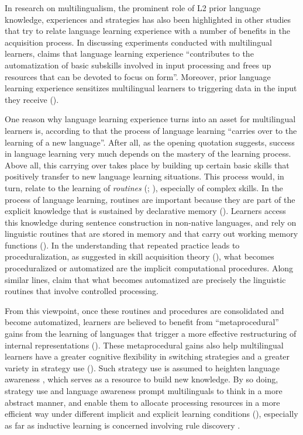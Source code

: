 \documentclass[output=paper]{../langscibook}
\begin{document}
In research on multilingualism, the prominent role of L2 prior language knowledge, experiences and strategies has also been highlighted in other studies that try to relate language learning experience with a number of benefits in the acquisition process. In discussing experiments conducted with multilingual learners, \citet[35]{Sanz2000} claims that language learning experience “contributes to the automatization of basic subskills involved in input processing and frees up resources that can be devoted to focus on form”. Moreover, prior language learning experience sensitizes multilingual learners to triggering data in the input they receive (\citealt{Zobl1992, Klein1995}).

One reason why language learning experience turns into an asset for multilingual learners is, according to \citet[6]{McLaughlinNayak1989} that the process of language learning “carries over to the learning of a new language”. After all, as the opening quotation suggests, success in language learning very much depends on the mastery of the learning process. Above all, this carrying over takes place by building up certain basic skills that positively transfer to new language learning situations. This process would, in turn, relate to the learning of \textit{routines} (\citealt[360]{Jessner2008Knowledge}; \citealt[804]{RutgersEvans2017}), especially of complex skills. In the process of language learning, routines are important because they are part of the explicit knowledge that is sustained by declarative memory (\citealt{Paradis2009, SharwoodSmith2010, TagarelliEtAl2011}). Learners access this knowledge during sentence construction in non-native languages, and rely on linguistic routines that are stored in memory and that carry out working memory functions (\citealt{BaarsFranklin2003, SharwoodSmith2010}). In the understanding that repeated practice leads to proceduralization, as suggested in skill acquisition theory (\citealt{DeKeyser2007,DeKeyser2010}), what becomes proceduralized or automatized are the implicit computational procedures. Along similar lines, \citet{RutgersEvans2017} claim that what becomes automatized are precisely the linguistic routines that involve controlled processing.

From this viewpoint, once these routines and procedures are consolidated and become automatized, learners are believed to benefit from ``metaprocedural'' gains from the learning of languages that trigger a more effective restructuring of internal representations (\citealt{McLaughlinNayak1989, NayakEtAl1990}). These metaprocedural gains also help multilingual learners have a greater cognitive flexibility in switching strategies and a greater variety in strategy use (\citealt{Missler2000, Kemp2007}). Such strategy use is assumed to heighten language awareness \citep{Thomas1992}, which serves as a resource to build new knowledge. By so doing, strategy use and language awareness prompt multilinguals to think in a more abstract manner, and enable them to allocate processing resources in a more efficient way under different implicit and explicit learning conditions (\citealt{NationMcLaughlin1986}), especially as far as inductive learning is concerned involving rule discovery \citep{NayakEtAl1990}.
\end{document}
